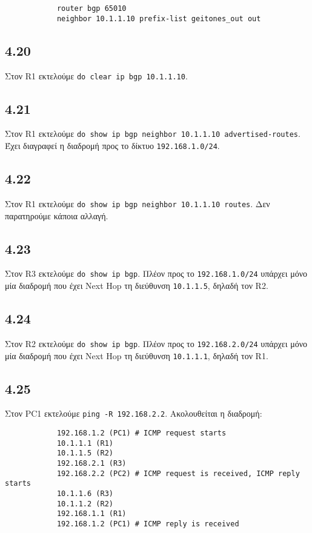 \documentclass[a4paper, 12pt]{article}
\begin{document}
		\begin{verbatim}
			router bgp 65010
			neighbor 10.1.1.10 prefix-list geitones_out out 
		\end{verbatim}

	\subsection*{4.20}
		Στον R1 εκτελούμε \verb|do clear ip bgp 10.1.1.10|.

	\subsection*{4.21}
		Στον R1 εκτελούμε \verb|do show ip bgp neighbor 10.1.1.10 advertised-routes|. Έχει διαγραφεί η διαδρομή προς το δίκτυο \verb|192.168.1.0/24|. 

	\subsection*{4.22}
		Στον R1 εκτελούμε \verb|do show ip bgp neighbor 10.1.1.10 routes|. Δεν παρατηρούμε κάποια αλλαγή.

	\subsection*{4.23}
		Στον R3 εκτελούμε \verb|do show ip bgp|. Πλέον προς το \verb|192.168.1.0/24| υπάρχει μόνο μία διαδρομή που έχει Next Hop τη διεύθυνση \verb|10.1.1.5|, δηλαδή τον R2.

	\subsection*{4.24}
		Στον R2 εκτελούμε \verb|do show ip bgp|. Πλέον προς το \verb|192.168.2.0/24| υπάρχει μόνο μία διαδρομή που έχει Next Hop τη διεύθυνση \verb|10.1.1.1|, δηλαδή τον R1.

	\subsection*{4.25}
		Στον PC1 εκτελούμε \verb|ping -R 192.168.2.2|. Ακολουθείται η διαδρομή:
		
		\begin{verbatim}
			192.168.1.2 (PC1) # ICMP request starts
			10.1.1.1 (R1) 
			10.1.1.5 (R2)
			192.168.2.1 (R3)
			192.168.2.2 (PC2) # ICMP request is received, ICMP reply starts
			10.1.1.6 (R3)
			10.1.1.2 (R2)
			192.168.1.1 (R1)
			192.168.1.2 (PC1) # ICMP reply is received
		\end{verbatim}
\end{document}
